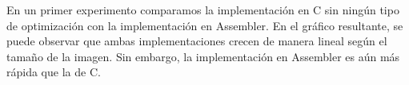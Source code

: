 \documentclass[a4paper]{article}
\begin{document}
En un primer experimento comparamos la implementación en C sin ningún tipo de optimización con la implementación en Assembler. En el gráfico 
resultante, se puede observar que ambas implementaciones crecen de manera lineal según el tamaño de la imagen. Sin embargo, la implementación en 
Assembler es aún más rápida que la de C.

\noindent%
\begin{minipage}{\linewidth}%
\end{minipage}
\ \
\end{document}
